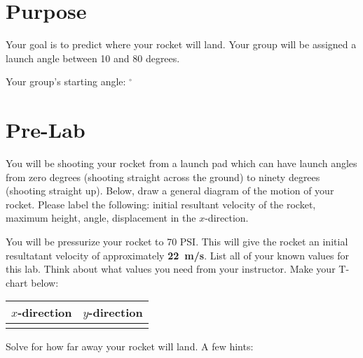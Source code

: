 \documentclass[10pt]{exam}
\begin{document}
  \section*{Purpose}

  Your goal is to predict where your rocket will land.  Your group will be assigned a launch angle between 10 and 80 degrees.

  \begin{center}
    Your group's starting angle: \fillin[][3em]$^\circ$
  \end{center}

\section*{Pre-Lab}

\begin{questions}

  \question \label{diagram}
    You will be shooting your rocket from a launch pad which can have launch angles from zero degrees (shooting straight across the ground) to ninety degrees (shooting straight up).  Below, draw a general diagram of the motion of your rocket.  Please label the following: initial resultant velocity of the rocket, maximum height, angle, displacement in the $x$-direction.

    \vspace{6em}


  \pagebreak

  \question \label{t-chart}
    You will be pressurize your rocket to 70 PSI.  This will give the rocket an initial resultatant velocity of approximately \textbf{22~m/s}.  List all of your known values for this lab.  Think about what values you need from your instructor.  Make your T-chart below:

    \begin{center}
      \begin{tabular}{l|c}
        $x$-direction & $y$-direction \\\hline
        & \\[6em]
      \end{tabular}
    \end{center}

  \question \label{calc}
    Solve for how far away your rocket will land.  A few hints:

\end{questions}
\end{document}
